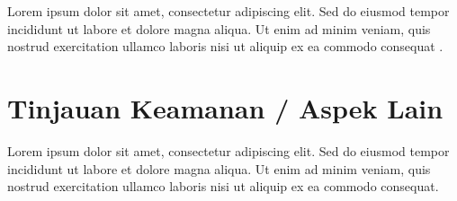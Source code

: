
Lorem ipsum dolor sit amet, consectetur adipiscing elit. Sed do eiusmod tempor incididunt ut labore et dolore magna aliqua. Ut enim ad minim veniam, quis nostrud exercitation ullamco laboris nisi ut aliquip ex ea commodo consequat \citep{referensi3}.

\section{Tinjauan Keamanan / Aspek Lain}


Lorem ipsum dolor sit amet, consectetur adipiscing elit. Sed do eiusmod tempor incididunt ut labore et dolore magna aliqua. Ut enim ad minim veniam, quis nostrud exercitation ullamco laboris nisi ut aliquip ex ea commodo consequat.
